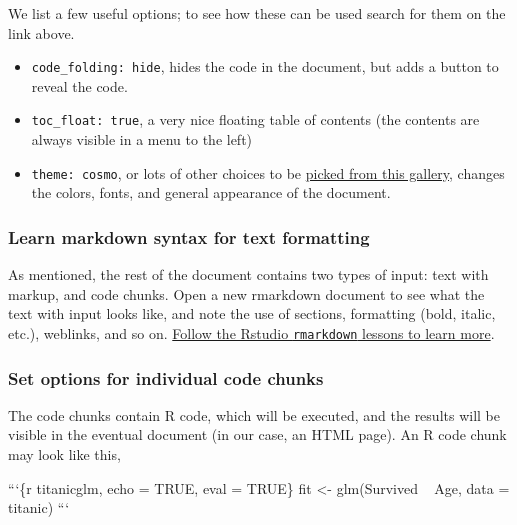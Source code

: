 \documentclass[]{book}
\newenvironment{Shaded}{\begin{snugshade}}{\end{snugshade}}
\newcommand{\DataTypeTok}[1]{\textcolor[rgb]{0.13,0.29,0.53}{#1}}
\newcommand{\StringTok}[1]{\textcolor[rgb]{0.31,0.60,0.02}{#1}}
\providecommand{\tightlist}{%
  \setlength{\itemsep}{0pt}\setlength{\parskip}{0pt}}
\begin{document}
We list a few useful options; to see how these can be used search for them on the link above.

\begin{itemize}
\tightlist
\item
  \texttt{code\_folding:\ hide}, hides the code in the document, but adds a button to reveal the code.
\item
  \texttt{toc\_float:\ true}, a very nice floating table of contents (the contents are always visible in a menu to the left)
\item
  \texttt{theme:\ cosmo}, or lots of other choices to be \href{https://bootswatch.com/3/}{picked from this gallery}, changes the colors, fonts, and general appearance of the document.
\end{itemize}

\hypertarget{learn-markdown-syntax-for-text-formatting}{%
\subsubsection*{Learn markdown syntax for text formatting}\label{learn-markdown-syntax-for-text-formatting}}

As mentioned, the rest of the document contains two types of input: text with markup, and code chunks. Open a new rmarkdown document to see what the text with input looks like, and note the use of sections, formatting (bold, italic, etc.), weblinks, and so on. \href{https://rmarkdown.rstudio.com/lesson-2.html}{Follow the Rstudio \texttt{rmarkdown} lessons to learn more}.

\hypertarget{set-options-for-individual-code-chunks}{%
\subsubsection*{Set options for individual code chunks}\label{set-options-for-individual-code-chunks}}

The code chunks contain R code, which will be executed, and the results will be visible in the eventual document (in our case, an HTML page). An R code chunk may look like this,

\begin{Shaded}
\begin{Highlighting}[]

\StringTok{```}\DataTypeTok{\{r titanicglm, echo = TRUE, eval = TRUE\}}
\DataTypeTok{fit <- glm(Survived ~ Age, data = titanic)}
\StringTok{```}
\end{Highlighting}
\end{Shaded}
\end{document}
